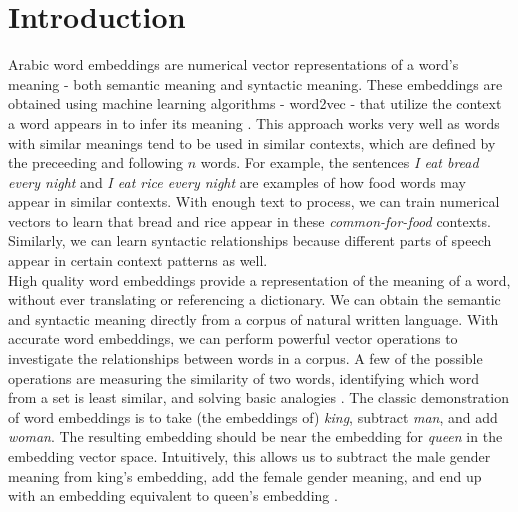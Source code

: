 \chapter{Introduction}
\label{sec:introduction}


Arabic word embeddings are numerical vector representations of a word's meaning - both semantic meaning and syntactic meaning. These embeddings are obtained using machine learning algorithms - word2vec - that utilize the context a word appears in to infer its meaning \cite{mikoloveffic:2013,mikolovdist:2013}. This approach works very well as words with similar meanings tend to be used in similar contexts, which are defined by the preceeding and following $n$ words. For example, the sentences \textit{I eat bread every night} and \textit{I eat rice every night} are examples of how food words may appear in similar contexts. With enough text to process, we can train numerical vectors to learn that bread and rice appear in these \textit{common-for-food} contexts. Similarly, we can learn syntactic relationships because different parts of speech appear in certain context patterns as well.
\\
High quality word embeddings provide a representation of the meaning of a word, without ever translating or referencing a dictionary. We can obtain the semantic and syntactic meaning directly from a corpus of natural written language. With accurate word embeddings, we can perform powerful vector operations to investigate the relationships between words in a corpus. A few of the possible operations are measuring the similarity of two words, identifying which word from a set is least similar, and solving basic analogies \cite{mikolovdist:2013}. The classic demonstration of word embeddings is to take (the embeddings of) \textit{king}, subtract \textit{man}, and add \textit{woman}. The resulting embedding should be near the embedding for \textit{queen} in the embedding vector space. Intuitively, this allows us to subtract the male gender meaning from king's embedding, add the female gender meaning, and end up with an embedding equivalent to queen's embedding \cite{mikolov2013linguistic}.
\\
